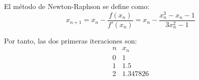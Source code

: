 \begin{ejercicio}
\begin{enumerate}
        El método de Newton-Raphson se define como:
        \begin{equation*}
            x_{n+1} = x_n - \dfrac{f(x_n)}{f'(x_n)} = x_n - \dfrac{x_n^3 - x_n - 1}{3x_n^2 - 1}
        \end{equation*}

        Por tanto, las dos primeras iteraciones son:
        \begin{equation*}
            \begin{array}{c|c}
                n & x_n\\ \hline
                0 & 1 \\
                1 & 1.5\\
                2 & 1.347826
            \end{array}
        \end{equation*}

    \end{enumerate}
\end{ejercicio}

